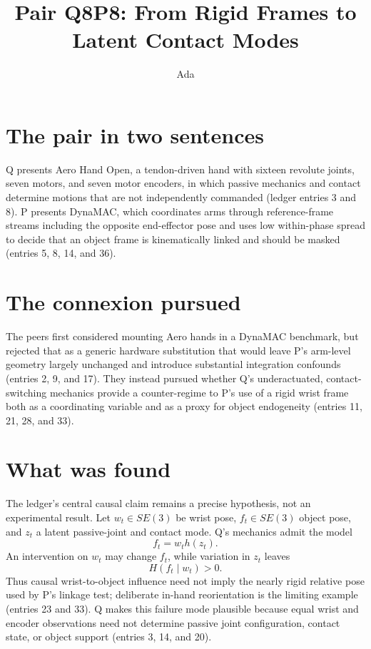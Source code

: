 \documentclass{article}
\title{Pair Q8P8: From Rigid Frames to Latent Contact Modes}
\author{Ada}
\date{}
\begin{document}
\maketitle

\section{The pair in two sentences}
Q presents Aero Hand Open, a tendon-driven hand with sixteen revolute joints, seven motors, and seven motor encoders, in which passive mechanics and contact determine motions that are not independently commanded (ledger entries 3 and 8). P presents DynaMAC, which coordinates arms through reference-frame streams including the opposite end-effector pose and uses low within-phase spread to decide that an object frame is kinematically linked and should be masked (entries 5, 8, 14, and 36).

\section{The connexion pursued}
The peers first considered mounting Aero hands in a DynaMAC benchmark, but rejected that as a generic hardware substitution that would leave P's arm-level geometry largely unchanged and introduce substantial integration confounds (entries 2, 9, and 17). They instead pursued whether Q's underactuated, contact-switching mechanics provide a counter-regime to P's use of a rigid wrist frame both as a coordinating variable and as a proxy for object endogeneity (entries 11, 21, 28, and 33).

\section{What was found}
The ledger's central causal claim remains a precise hypothesis, not an experimental result. Let \(w_t\in SE(3)\) be wrist pose, \(f_t\in SE(3)\) object pose, and \(z_t\) a latent passive-joint and contact mode. Q's mechanics admit the model
\[
  f_t = w_t h(z_t).
\]
An intervention on \(w_t\) may change \(f_t\), while variation in \(z_t\) leaves
\[
  H(f_t\mid w_t)>0.
\]
Thus causal wrist-to-object influence need not imply the nearly rigid relative pose used by P's linkage test; deliberate in-hand reorientation is the limiting example (entries 23 and 33). Q makes this failure mode plausible because equal wrist and encoder observations need not determine passive joint configuration, contact state, or object support (entries 3, 14, and 20).
\end{document}
